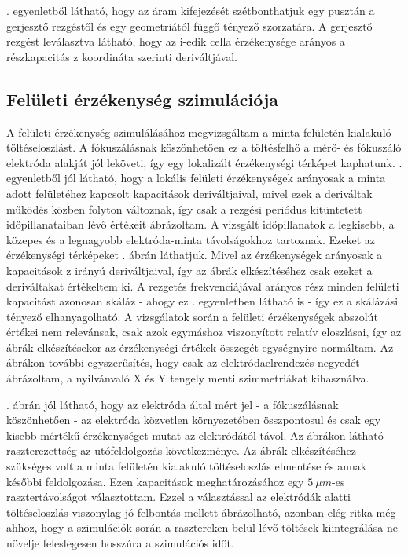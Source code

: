 
. egyenletből látható, hogy az áram kifejezését szétbonthatjuk egy pusztán a gerjesztő rezgéstől és egy geometriától függő tényező szorzatára. A gerjesztő rezgést leválasztva látható, hogy az i-edik cella érzékenysége arányos a részkapacitás z koordináta szerinti deriváltjával.


\subsection{Felületi érzékenység szimulációja}

A felületi érzékenység szimulálásához megvizsgáltam a minta felületén kialakuló töltéseloszlást. A fókuszálásnak köszönhetően ez a töltésfelhő a mérő- és fókuszáló elektróda alakját jól leköveti, így egy lokalizált érzékenységi térképet kaphatunk. . egyenletből jól látható, hogy a lokális felületi érzékenységek arányosak a minta adott felületéhez kapcsolt kapacitások deriváltjaival, mivel ezek a deriváltak működés közben folyton változnak, így csak a rezgési periódus kitüntetett időpillanataiban lévő értékeit ábrázoltam. A vizsgált időpillanatok a legkisebb, a közepes és a legnagyobb elektróda-minta távolságokhoz tartoznak. Ezeket az érzékenységi térképeket . ábrán láthatjuk. Mivel az érzékenységek arányosak a kapacitások z irányú deriváltjaival, így az ábrák elkészítéséhez csak ezeket a deriváltakat értékeltem ki. A rezgetés frekvenciájával arányos rész minden felületi kapacitást azonosan skáláz - ahogy ez . egyenletben látható is - így ez a skálázási tényező elhanyagolható. A vizsgálatok során a felületi érzékenységek abszolút értékei nem relevánsak, csak azok egymáshoz viszonyított relatív eloszlásai, így az ábrák elkészítésekor az érzékenységi értékek összegét egységnyire normáltam. Az ábrákon további egyszerűsítés, hogy csak az elektródaelrendezés negyedét ábrázoltam, a nyilvánvaló X és Y tengely menti szimmetriákat kihasználva.


. ábrán jól látható, hogy az elektróda által mért jel - a fókuszálásnak köszönhetően - az elektróda közvetlen környezetében összpontosul és csak egy kisebb mértékű érzékenységet mutat az elektródától távol. Az ábrákon látható raszterezettség az utófeldolgozás következménye. Az ábrák elkészítéséhez szükséges volt a minta felületén kialakuló töltéseloszlás elmentése és annak későbbi feldolgozása. Ezen kapacitások meghatározásához egy $5\ \mu m$-es rasztertávolságot választottam. Ezzel a választással az elektródák alatti töltéseloszlás viszonylag jó felbontás mellett ábrázolható, azonban elég ritka még ahhoz, hogy a szimulációk során a rasztereken belül lévő töltések kiintegrálása ne növelje feleslegesen hosszúra a szimulációs időt.

